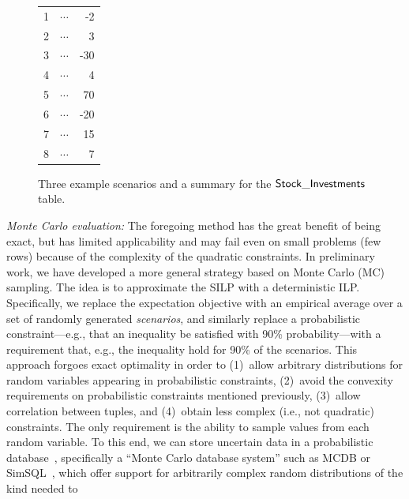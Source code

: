 \documentclass[11pt]{article}
\newcommand{\ssf}[1]{{${\sf #1}$}}
\begin{document}
\begin{figure}[t!]
\begin{tabular}{ccr}
\hline
1  & $\cdots$ & -2\\
2  & $\cdots$ & 3\\
3  & $\cdots$ & -30\\
4  & $\cdots$ & 4\\
5  & $\cdots$ & 70\\
6  & $\cdots$ & -20\\
7  & $\cdots$ & 15\\
8  & $\cdots$ & 7\\
\hline
\end{tabular}
\caption{Three example scenarios and a summary for the \ssf{Stock\_Investments} table.}
\label{fig:threescenarios}
\vspace{-3mm}
\end{figure}

\smallskip
\emph{Monte Carlo evaluation:} The foregoing method has the great benefit of being exact, but has  limited applicability and may fail even on small problems (few rows) because of the complexity of the quadratic constraints. In preliminary work, we have developed a more general strategy based on Monte Carlo (MC) sampling. The idea is to approximate the SILP with a deterministic ILP. Specifically, we replace the expectation objective with an empirical average over a set of randomly generated \emph{scenarios}, and similarly replace a probabilistic constraint---e.g., that an inequality be satisfied with 90\% probability---with a requirement that, e.g., the inequality hold for 90\% of the scenarios. This approach forgoes exact optimality in order to (1)~allow arbitrary distributions for random variables appearing in probabilistic constraints, (2)~avoid the convexity requirements on probabilistic constraints mentioned previously, (3)~allow correlation between tuples, and (4)~obtain less complex (i.e., not quadratic) constraints. The only requirement is the ability to sample values from each random variable. To this end, we can store uncertain data in a probabilistic database~\cite{suciu2011probabilistic}, specifically a ``Monte Carlo database system'' such as MCDB or SimSQL~\cite{AJP+10,Cai+13,JampaniXWPJH11,JampaniXWPJH08,PerezAJ10},
which offer support for arbitrarily complex random distributions of the kind needed to
\end{document}
